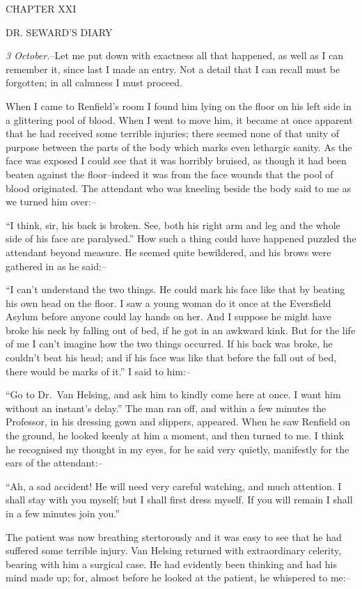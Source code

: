 \documentclass[12pt,openright]{book}
\begin{document}
CHAPTER XXI

DR. SEWARD’S DIARY

\textit{3 October.}–Let me put down with exactness all that happened, as well as I can remember it, since last I made an entry. Not a detail that I can recall must be forgotten; in all calmness I must proceed.

When I came to Renfield’s room I found him lying on the floor on his left side in a glittering pool of blood. When I went to move him, it became at once apparent that he had received some terrible injuries; there seemed none of that unity of purpose between the parts of the body which marks even lethargic sanity. As the face was exposed I could see that it was horribly bruised, as though it had been beaten against the floor–indeed it was from the face wounds that the pool of blood originated. The attendant who was kneeling beside the body said to me as we turned him over:–

“I think, sir, his back is broken. See, both his right arm and leg and the whole side of his face are paralysed.” How such a thing could have happened puzzled the attendant beyond measure. He seemed quite bewildered, and his brows were gathered in as he said:–

“I can’t understand the two things. He could mark his face like that by beating his own head on the floor. I saw a young woman do it once at the Eversfield Asylum before anyone could lay hands on her. And I suppose he might have broke his neck by falling out of bed, if he got in an awkward kink. But for the life of me I can’t imagine how the two things occurred. If his back was broke, he couldn’t beat his head; and if his face was like that before the fall out of bed, there would be marks of it.” I said to him:–

“Go to Dr. Van Helsing, and ask him to kindly come here at once. I want him without an instant’s delay.” The man ran off, and within a few minutes the Professor, in his dressing gown and slippers, appeared. When he saw Renfield on the ground, he looked keenly at him a moment, and then turned to me. I think he recognised my thought in my eyes, for he said very quietly, manifestly for the ears of the attendant:–

“Ah, a sad accident! He will need very careful watching, and much attention. I shall stay with you myself; but I shall first dress myself. If you will remain I shall in a few minutes join you.”

The patient was now breathing stertorously and it was easy to see that he had suffered some terrible injury. Van Helsing returned with extraordinary celerity, bearing with him a surgical case. He had evidently been thinking and had his mind made up; for, almost before he looked at the patient, he whispered to me:–
\end{document}
